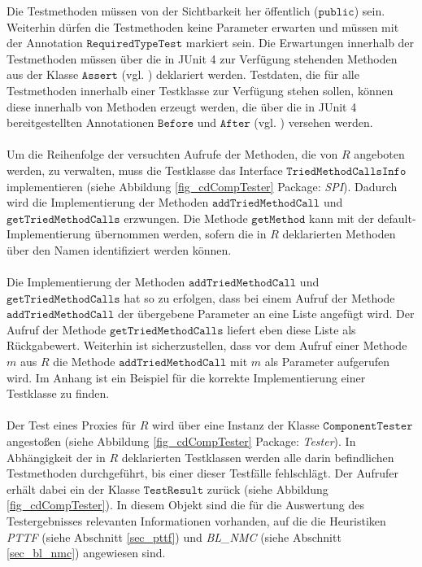 Die Testmethoden müssen von der Sichtbarkeit her öffentlich ($\texttt{public}$) sein. Weiterhin dürfen die Testmethoden keine Parameter erwarten und müssen mit der Annotation $\texttt{RequiredTypeTest}$ markiert sein. Die Erwartungen innerhalb der Testmethoden müssen über die in JUnit 4 zur Verfügung stehenden Methoden aus der Klasse $\texttt{Assert}$ (vgl. \cite{junit_api}) deklariert werden. Testdaten, die für alle Testmethoden innerhalb einer Testklasse zur Verfügung stehen sollen, können diese innerhalb von Methoden erzeugt werden, die über die in JUnit 4 bereitgestellten Annotationen $\texttt{Before}$ und $\texttt{After}$ (vgl. \cite{junit_api}) versehen werden.
\\\\
Um die Reihenfolge der versuchten Aufrufe der Methoden, die von $R$ angeboten werden, zu verwalten, muss die Testklasse das Interface $\texttt{TriedMethodCallsInfo}$ implementieren (siehe Abbildung \ref{fig_cdCompTester} Package: \emph{SPI}). Dadurch wird die Implementierung der Methoden $\texttt{addTriedMethodCall}$ und $\texttt{getTriedMethodCalls}$ erzwungen. Die Methode $\texttt{getMethod}$ kann mit der default-Implementierung übernommen werden, sofern die in $R$ deklarierten Methoden über den Namen identifiziert werden können.
\\\\
Die Implementierung der Methoden $\texttt{addTriedMethodCall}$ und $\texttt{getTriedMethodCalls}$ hat so zu erfolgen, dass bei einem Aufruf der Methode $\texttt{addTriedMethodCall}$ der übergebene Parameter an eine Liste angefügt wird. Der Aufruf der Methode $\texttt{getTriedMethodCalls}$ liefert eben diese Liste als Rückgabewert. Weiterhin ist sicherzustellen, dass vor dem Aufruf einer Methode $m$ aus $R$ die Methode $\texttt{addTriedMethodCall}$ mit $m$ als Parameter aufgerufen wird. Im Anhang ist ein Beispiel für die korrekte Implementierung einer Testklasse zu finden.
\\\\
Der Test eines Proxies für $R$ wird über eine Instanz der Klasse $\texttt{ComponentTester}$ angestoßen (siehe Abbildung \ref{fig_cdCompTester} Package: \emph{Tester}). In Abhängigkeit der in $R$ deklarierten Testklassen werden alle darin befindlichen Testmethoden durchgeführt, bis einer dieser Testfälle fehlschlägt. Der Aufrufer erhält dabei ein der Klasse $\texttt{TestResult}$ zurück (siehe Abbildung \ref{fig_cdCompTester}). In diesem Objekt sind die für die Auswertung des Testergebnisses relevanten Informationen vorhanden, auf die die Heuristiken \emph{PTTF} (siehe Abschnitt \ref{sec_pttf}) und \emph{BL\_NMC} (siehe Abschnitt \ref{sec_bl_nmc}) angewiesen sind.
